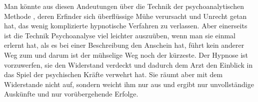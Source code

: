 \documentclass[twoside=true,titlepage=false,open=any, parskip=never, fontsize=10pt, headings=small, chapterprefix=false, appendixprefix=false]{scrbook}
\begin{document}
            
        \pstart
        Man könnte aus diesen Andeutungen über die Technik der psychoanalytischen
               Methode ,  deren Erfinder sich überflüssige Mühe verursacht und Unrecht getan hat,
               das wenig komplizierte hypnotische Verfahren zu verlassen. Aber einerseits
               ist die Technik  Psychoanalyse viel leichter auszuüben, wenn man sie einmal erlernt hat,
               als es bei einer Beschreibung den Anschein hat,  führt kein anderer Weg zum  und darum ist der mühselige Weg noch der kürzeste. Der Hypnose ist
               vorzuwerfen,  sie den Widerstand verdeckt und dadurch dem Arzt den Einblick in das
               Spiel der psychischen Kräfte verwehrt hat. Sie räumt aber mit dem Widerstande nicht auf, sondern weicht
               ihm nur aus und ergibt  nur unvollständige Auskünfte und nur vorübergehende
                  Erfolge.
        \pend
    
\end{document}

